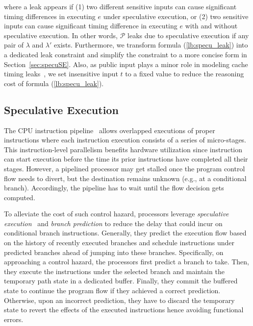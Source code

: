 \documentclass[sigconf,screen]{acmart}
\newcommand\ignore[1]{}
\newcommand{\prog}{\mathcal{P}}
\begin{document}
%
where a leak appears if (1) two different sensitive inputs can cause significant 
timing differences in executing $\mathit{e}$ under speculative execution, or (2) 
two sensitive inputs can cause significant timing difference in executing $\mathit{e}$ 
with and without speculative execution. In other words, $\prog$ leaks due to 
speculative execution if any pair of $\lambda$ and $\lambda'$ exists. Furthermore, 
we transform formula (\ref{lb:specu_leak}) into a dedicated leak constraint and 
simplify the constraint to a more concise form in Section~\ref{sec:specuSE}. Also, 
as public input plays a minor role in modeling cache timing leaks~\cite{WangBLWZW19}, 
we set insensitive input $t$ to a fixed value to reduce the reasoning cost of formula
(\ref{lb:specu_leak}). 


\ignore{
Also, we assume $\prog$ has the same set of instructions on each program path and 
speculative execution only changes the cache state. 
}



\subsection{Speculative Execution}
\label{sec:specu}


The CPU instruction pipeline~\cite{RamamoorthyL77} allows overlapped executions 
of proper instructions where each instruction execution consists of a series of 
micro-stages. This instruction-level parallelism benefits hardware utilization 
since instruction can start execution before the time its prior instructions 
have completed all their stages. However, a pipelined processor may get stalled 
once the program control flow needs to divert, but the destination remains 
unknown (e.g., at a conditional branch). Accordingly, the pipeline has to wait 
until the flow decision gets computed.


To alleviate the cost of such control hazard, processors leverage 
\textit{speculative execution}~\cite{kimuraKT1996} and \textit{branch prediction}
\cite{Mittal19} to reduce the delay that could incur on conditional branch 
instructions. Generally, they predict the execution flow based on the history 
of recently executed branches and schedule instructions under predicted 
branches ahead of jumping into these branches. Specifically, on approaching a 
control hazard, the processors first predict a branch to take. Then, they 
execute the instructions under the selected branch and maintain the temporary 
path state in a dedicated buffer. Finally, they commit the buffered state to 
continue the program flow if they achieved a correct prediction. Otherwise, 
upon an incorrect prediction, they have to discard the temporary state to 
revert the effects of the executed instructions hence avoiding functional errors. 
\end{document}
